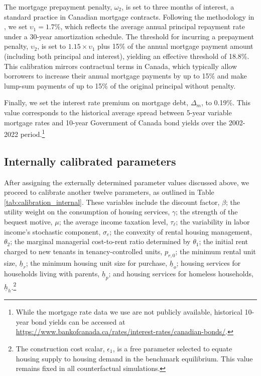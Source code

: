 \documentclass[parskip=full]{article}
\begin{document}
The mortgage prepayment penalty, $\omega_{2}$, is set to three months of interest, a standard practice in Canadian mortgage contracts. Following the methodology in \citet{kkk-2021}, we set $\upsilon_{1}=1.7\%$, which reflects the average annual principal repayment rate under a 30-year amortization schedule. The threshold for incurring a prepayment penalty, $\upsilon_{2}$, is set to $1.15 \times \upsilon_{1}$ plus 15\% of the annual mortgage payment amount (including both principal and interest), yielding an effective threshold of 18.8\%. This calibration mirrors contractual terms in Canada, which typically allow borrowers to increase their annual mortgage payments by up to 15\% and make lump-sum payments of up to 15\% of the original principal without penalty.

Finally, we set the interest rate premium on mortgage debt, $\Delta_{m}$, to 0.19\%. This value corresponds to the historical average spread between 5-year variable mortgage rates and 10-year Government of Canada bond yields over the 2002-2022 period.\footnote{While the mortgage rate data we use are not publicly available, historical 10-year bond yields can be accessed at \url{https://www.bankofcanada.ca/rates/interest-rates/canadian-bonds/}.}

\subsection{Internally calibrated parameters}

After assigning the externally determined parameter values discussed above, we proceed to calibrate another twelve parameters, as outlined in Table \ref{tab:calibration_internal}. These variables include the discount factor, $\beta$; the utility weight on the consumption of housing services, $\gamma$; the strength of the bequest motive, $\mu$; the average income taxation level, $\tau_{\ell}$; the variability in labor income's stochastic component, $\sigma_{e}$; the convexity of rental housing management, $\theta_{2}$; the marginal managerial cost-to-rent ratio determined by $\theta_{1}$; the initial rent charged to new tenants in tenancy-controlled units, $p_{r,0}$; the minimum rental unit size, $\underline{h}_{r}$; the minimum housing unit size for purchase, $\underline{h}_{o}$; housing services for households living with parents, $\underline{h}_{p}$; and housing services for homeless households, $\underline{h}_{h}$.\footnote{The construction cost scalar, $\epsilon_{1}$, is a free parameter selected to equate housing supply to housing demand in the benchmark equilibrium. This value remains fixed in all counterfactual simulations.}
\end{document}
